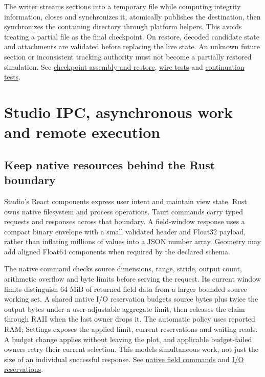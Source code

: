 The writer streams sections into a temporary file while computing integrity
information, closes and synchronizes it, atomically publishes the destination,
then synchronizes the containing directory through platform helpers. This
avoids treating a partial file as the final checkpoint. On restore, decoded
candidate state and attachments are validated before replacing the live state.
An unknown future section or inconsistent tracking authority must not become
a partially restored simulation. See
\href{../src/core/runtime/simulation_checkpoint.cpp}{checkpoint assembly and restore},
\href{../tests/core/test_checkpoint_wire.cpp}{wire tests} and
\href{../tests/core/test_simulation_checkpoint.cpp}{continuation tests}.

\section{Studio IPC, asynchronous work and remote execution}
\label{architecture-ipc}

\subsection{Keep native resources behind the Rust boundary}

Studio's React components express user intent and maintain view state. Rust
owns native filesystem and process operations. Tauri commands carry typed
requests and responses across that boundary. A field-window response uses a
compact binary envelope with a small validated header and Float32 payload,
rather than inflating millions of values into a JSON number array. Geometry
may add aligned Float64 components when required by the declared schema.

The native command checks source dimensions, range, stride, output count,
arithmetic overflow and byte limits before serving the request. Its current
window limits distinguish 64 MiB of returned field data from a larger bounded
source working set. A shared native I/O reservation budgets source bytes plus
twice the output bytes under a user-adjustable aggregate limit, then releases
the claim through RAII when the last owner drops it. The automatic policy uses
reported RAM; Settings exposes the applied limit, current reservations and
waiting reads. A budget change applies without leaving the plot, and applicable
budget-failed owners retry their current selection. This models simultaneous
work, not just the size of an individual successful response. See
\href{../ui/src-tauri/src/commands/outputs.rs}{native field commands} and
\href{../ui/src-tauri/src/commands/io_budget.rs}{I/O reservations}.


